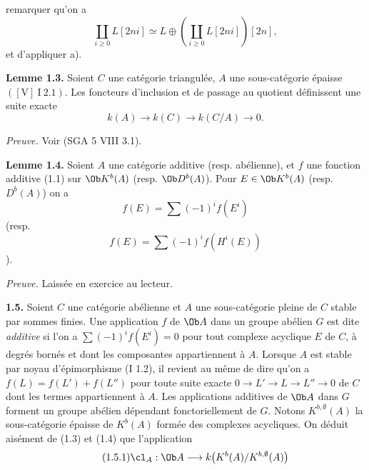 remarquer qu'on a
\[
 \coprod_{i\geq0} L[2ni]\simeq
 L\oplus\left(\coprod_{i\geq0}L[2ni]\right)[2n],
\]
et d'appliquer a).

\textbf{Lemme 1.3.} Soient \(C\) une catégorie triangulée, \(A\) une sous-catégorie épaisse \(([\mathrm V]\ \mathrm I\ 2.1)\). Les foncteurs d'inclusion et de passage au quotient définissent une suite exacte
\[
 k(A)\longrightarrow k(C)\longrightarrow k(C/A)\longrightarrow 0.
\]

\emph{Preuve.} Voir (SGA 5 VIII 3.1).

\textbf{Lemme 1.4.} Soient \(A\) une catégorie additive (resp. abélienne), et \(f\) une fonction additive (1.1) sur \(\Ob K^b(A)\) (resp. \(\Ob D^b(A)\)). Pour \(E\in\Ob K^b(A)\) (resp. \(D^b(A)\)) on a
\[
 f(E)=\sum(-1)^i f(E^i)
\]
(resp.
\[
 f(E)=\sum(-1)^i f(H^i(E))
\]).

\emph{Preuve.} Laissée en exercice au lecteur.

\textbf{1.5.} Soient \(C\) une catégorie abélienne et \(A\) une sous-catégorie pleine de \(C\) stable par sommes finies. Une application \(f\) de \(\Ob A\) dans un groupe abélien \(G\) est dite \emph{additive} si l'on a \(\sum(-1)^i f(E^i)=0\) pour tout complexe acyclique \(E\) de \(C\), à degrés bornés et dont les composantes appartiennent à \(A\). Lorsque \(A\) est stable par noyau d'épimorphisme (I 1.2), il revient au même de dire qu'on a \(f(L)=f(L')+f(L'')\) pour toute suite exacte \(0\longrightarrow L'\longrightarrow L\longrightarrow L''\longrightarrow0\) de \(C\) dont les termes appartiennent à \(A\). Les applications additives de \(\Ob A\) dans \(G\) forment un groupe abélien dépendant fonctoriellement de \(G\). Notons \(K^{b,\emptyset}(A)\) la sous-catégorie épaisse de \(K^b(A)\) formée des complexes acycliques. On déduit aisément de (1.3) et (1.4) que l'application
\begin{equation}\tag{1.5.1}
 \cl_A:\Ob A\longrightarrow k\bigl(K^b(A)/K^{b,\emptyset}(A)\bigr)
\end{equation}
